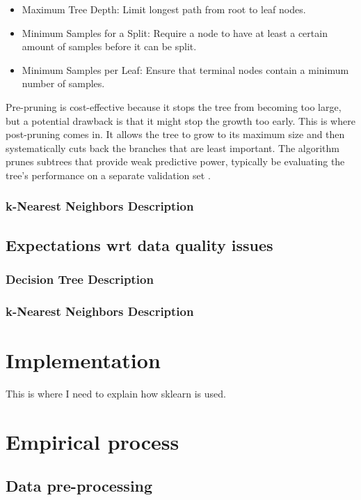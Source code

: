 \documentclass[conference]{IEEEtran}
\begin{document}
\begin{itemize}
    \item Maximum Tree Depth: Limit longest path from root to leaf nodes.
    \item Minimum Samples for a Split: Require a node to have at least a certain amount of samples before it can be split.
    \item Minimum Samples per Leaf: Ensure that terminal nodes contain a minimum number of samples.
\end{itemize}

Pre-pruning is cost-effective because it stops the tree from becoming too large, but a potential drawback is that it might stop the growth too early. This is where post-pruning comes in. It allows the tree to grow to its maximum size and then systematically cuts back the branches that are least important. The algorithm prunes subtrees that provide weak predictive power, typically be evaluating the tree's performance on a separate validation set \cite{b1}.

\subsubsection{k-Nearest Neighbors Description}

\subsection{Expectations wrt data quality issues}

\subsubsection{Decision Tree Description}

\subsubsection{k-Nearest Neighbors Description}


\section{Implementation}
This is where I need to explain how sklearn is used.

\section{Empirical process}

\subsection{Data pre-processing}
\end{document}
